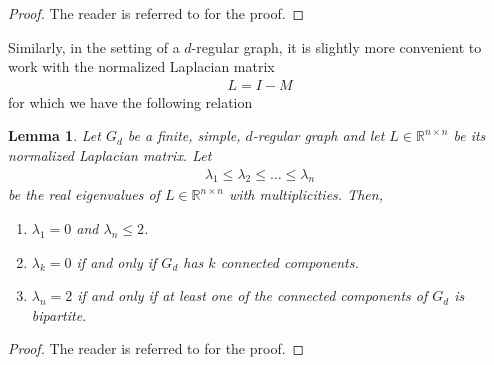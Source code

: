 \documentclass[reqno,8pt]{amsart}
\newtheorem{lemma}{Lemma}
\theoremstyle{definition}
\theoremstyle{remark}
\newtheorem{remark}{Remark}
\numberwithin{equation}{section}
\def\bof{{\bf f}}
\def\R{\mathbb{R}}
\begin{document}
\begin{proof}
The reader is referred to \cite{God2001} for the proof.
\end{proof}
Similarly, in the setting of a $d$-regular graph, it is slightly more convenient to work with the normalized Laplacian matrix
\begin{align} \label{eq:normalizedLaplacian}
L = I-M
\end{align}
for which we have the following relation
\begin{lemma} \label{lem:eigL}
Let $G_d$ be a finite, simple, $d$-regular graph and let $L \in \R^{n \times n}$ be its normalized Laplacian matrix. Let 
\begin{align*}
\lambda_1 \leq \lambda_2 \leq \ldots \leq \lambda_n
\end{align*}
be the real eigenvalues of $L \in \R^{n \times n}$ with multiplicities. Then, 
\begin{enumerate}
\item $\lambda_1 = 0$ and $\lambda_n \leq 2$.
\item $\lambda_k = 0$ if and only if $G_d$ has $k$ connected components.
\item $\lambda_n = 2$ if and only if at least one of the connected components of $G_d$ is bipartite.
\end{enumerate}
\end{lemma}
\begin{proof}
The reader is referred to \cite{God2001} for the proof.
\end{proof}

\end{document}
